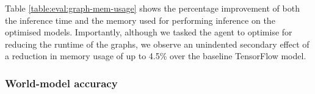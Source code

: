 \begin{table}[htbp]
  \centering
  \caption[Memory usage of optimised graphs]{Relative performance improvement of the graphs optimised by the model-based agent. We show the inference time, and memory used for performing inference on the model.}
  \label{table:eval:graph-mem-usage}
\end{table}

Table \ref{table:eval:graph-mem-usage} shows the percentage improvement of both the inference time and the memory used for performing inference on the optimised models. Importantly, although we tasked the agent to optimise for reducing the runtime of the graphs, we observe an unindented secondary effect of a reduction in memory usage of up to 4.5\% over the baseline TensorFlow model.

\subsubsection{World-model accuracy}
\label{sec:eval:subsubsec:wm-acc}

